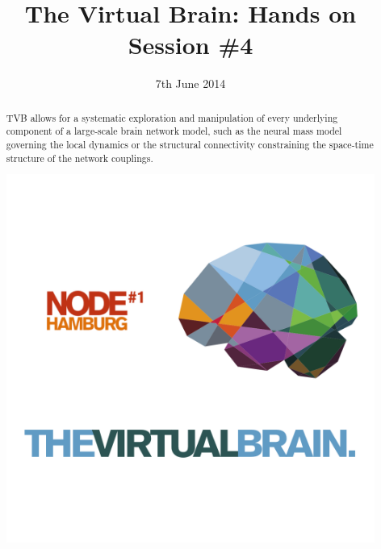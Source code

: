 \documentclass{tufte-handout}
\title{The Virtual Brain: Hands on Session \#4}
\date{7th June 2014}
\begin{document}
\maketitle %

\begin{abstract}

\noindent TVB allows for a systematic exploration and manipulation of every
underlying component of a large-scale brain network model, such as the neural
mass model governing the local dynamics or the structural connectivity
constraining the space-time structure of the network couplings.
\begin{marginfigure}%
  \includegraphics[width=\linewidth]{tvb_logo_transparent_square}
  \label{fig:marginfig}
\end{marginfigure}
\end{abstract}


\end{document}
